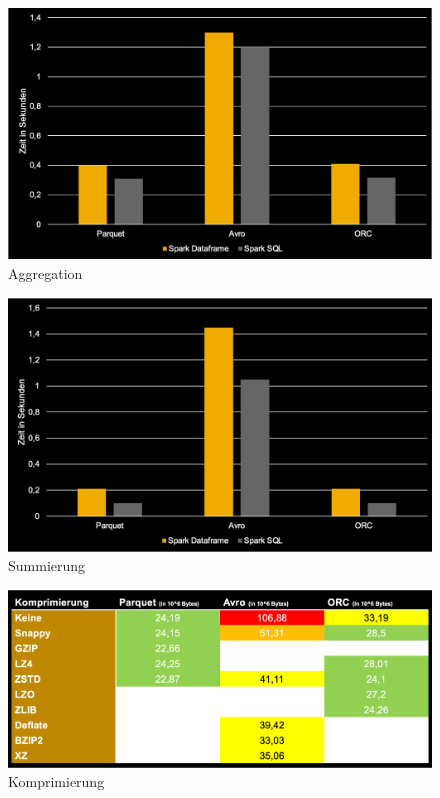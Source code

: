 \clearpage
\begin{figure}[ht]
	\centering
	\includegraphics[width=1\textwidth]{Bilder/Aggregation.png} 
	\caption{Aggregation}
	\label{fig:Aggregation}
\end{figure}
\clearpage
\begin{figure}[ht]
	\centering
	\includegraphics[width=1\textwidth]{Bilder/Summierung.png} 
	\caption{Summierung}
	\label{fig:Summierungen}
\end{figure}
\clearpage
\begin{figure}[ht]
	\centering
	\includegraphics[width=1\textwidth]{Bilder/Komprimierung.png} 
	\caption{Komprimierung}
	\label{fig:Komprimierung}
\end{figure}
\clearpage
